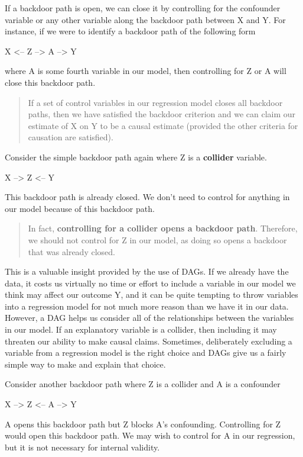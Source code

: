 \documentclass[
]{book}
\begin{document}
If a backdoor path is open, we can close it by controlling for the confounder variable or any other variable along the backdoor path between X and Y. For instance, if we were to identify a backdoor path of the following form

X \textless-- Z --\textgreater{} A --\textgreater{} Y

where A is some fourth variable in our model, then controlling for Z or A will close this backdoor path.

\begin{quote}
If a set of control variables in our regression model closes all backdoor paths, then we have satisfied the backdoor criterion and we can claim our estimate of X on Y to be a causal estimate (provided the other criteria for causation are satisfied).
\end{quote}

Consider the simple backdoor path again where Z is a \textbf{collider} variable.

X --\textgreater{} Z \textless-- Y

This backdoor path is already closed. We don't need to control for anything in our model because of this backdoor path.

\begin{quote}
In fact, \textbf{controlling for a collider opens a backdoor path}. Therefore, we should not control for Z in our model, as doing so opens a backdoor that was already closed.
\end{quote}

This is a valuable insight provided by the use of DAGs. If we already have the data, it costs us virtually no time or effort to include a variable in our model we think may affect our outcome Y, and it can be quite tempting to throw variables into a regression model for not much more reason than we have it in our data. However, a DAG helps us consider all of the relationships between the variables in our model. If an explanatory variable is a collider, then including it may threaten our ability to make causal claims. Sometimes, deliberately excluding a variable from a regression model is the right choice and DAGs give us a fairly simple way to make and explain that choice.

Consider another backdoor path where Z is a collider and A is a confounder

X --\textgreater{} Z \textless-- A --\textgreater{} Y

A opens this backdoor path but Z blocks A's confounding. Controlling for Z would open this backdoor path. We may wish to control for A in our regression, but it is not necessary for internal validity.
\end{document}
